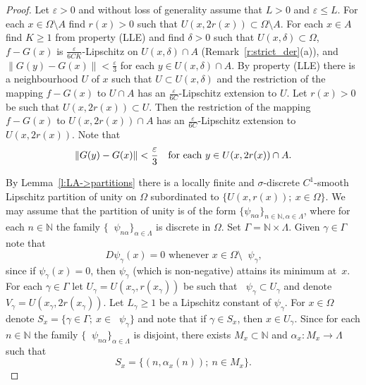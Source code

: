 \documentclass[a4paper,twoside,10pt,reqno,draft]{amsart}
\theoremstyle{definition}
\theoremstyle{remark}
\newcommand\setsep{;\allowbreak\ } %
\newcommand\norm[1]{\mathopen\|#1\mathclose\|}
\newcommand\al{\alpha}
\newcommand\ga{\gamma}
\newcommand\Ga{\Gamma}
\newcommand\de{\delta}
\newcommand\ve{\varepsilon}
\newcommand\Om{\Omega}
\newcommand\sg{\sigma}
\newcommand\N{{\mathbb N}}
\DeclareMathOperator{\suppo}{supp_o}
\newcommand\pLLE{(LLE)}
\begin{document}
\begin{proof}
Let $\ve>0$ and without loss of generality assume that $L>0$ and $\ve\le L$.
For each $x\in\Om\setminus A$ find $r(x)>0$ such that $U(x,2r(x))\subset\Om\setminus A$.
For each $x\in A$ find $K\ge1$ from property {\pLLE}
and find $\de>0$ such that $U(x,\de)\subset\Om$, $f-G(x)$ is $\frac\ve{6CK}$-Lipschitz on $U(x,\de)\cap A$ (Remark~\ref{r:strict_der}(a)), and $\norm{G(y)-G(x)}<\frac\ve3$ for each $y\in U(x,\de)\cap A$.
By property {\pLLE} there is a neighbourhood $U$ of $x$ such that $U\subset U(x,\de)$ and the restriction of the mapping $f-G(x)$ to $U\cap A$ has an $\frac\ve{6C}$-Lipschitz extension to $U$.
Let $r(x)>0$ be such that $U(x,2r(x))\subset U$.
Then the restriction of the mapping $f-G(x)$ to $U(x,2r(x))\cap A$ has an $\frac\ve{6C}$-Lipschitz extension to $U(x,2r(x))$.
Note that
\begin{equation}\label{e:Gest}
\norm{G(y)-G(x)}<\frac\ve3\text{\quad for each $y\in U(x,2r(x))\cap A$.}
\end{equation}

By Lemma~\ref{l:LA->partitions} there is a locally finite and $\sg$-discrete $C^1$-smooth Lipschitz partition of unity on $\Om$ subordinated to $\{U(x,r(x))\setsep x\in\Om\}$.
We may assume that the partition of unity is of the form $\{\psi_{n\al}\}_{n\in\N,\al\in\Lambda}$,
where for each $n\in\N$ the family $\{\suppo\psi_{n\al}\}_{\al\in\Lambda}$ is discrete in $\Om$.
Set $\Ga=\N\times\Lambda$.
Given $\ga\in\Ga$ note that
\begin{equation}\label{e:der0}
\text{$D\psi_\ga(x)=0$ whenever $x\in\Om\setminus\suppo\psi_\ga$,}
\end{equation}
since if $\psi_\ga(x)=0$, then $\psi_\ga$ (which is non-negative) attains its minimum at~$x$.
For each $\ga\in\Ga$ let $U_\ga=U(x_\ga,r(x_\ga))$ be such that $\suppo\psi_\ga\subset U_\ga$ and denote $V_\ga=U(x_\ga,2r(x_\ga))$.
Let $L_\ga\ge1$ be a Lipschitz constant of $\psi_\ga$.
For $x\in\Om$ denote $S_x=\{\ga\in\Ga\setsep x\in\suppo\psi_\ga\}$ and note that if $\ga\in S_x$, then $x\in U_\ga$.
Since for each $n\in\N$ the family $\{\suppo\psi_{n\al}\}_{\al\in\Lambda}$ is disjoint, there exists $M_x\subset\N$ and $\al_x\colon M_x\to\Lambda$ such that
\begin{equation}\label{e:S_x}
S_x=\bigl\{(n,\al_x(n))\setsep n\in M_x\bigr\}.
\end{equation}


\end{proof}
\end{document}
